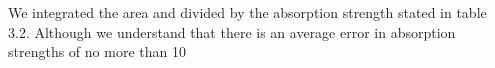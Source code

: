 We integrated the area and divided by the absorption strength stated in table 3.2. Although we understand that there is an average error in absorption strengths of no more than 10 %
